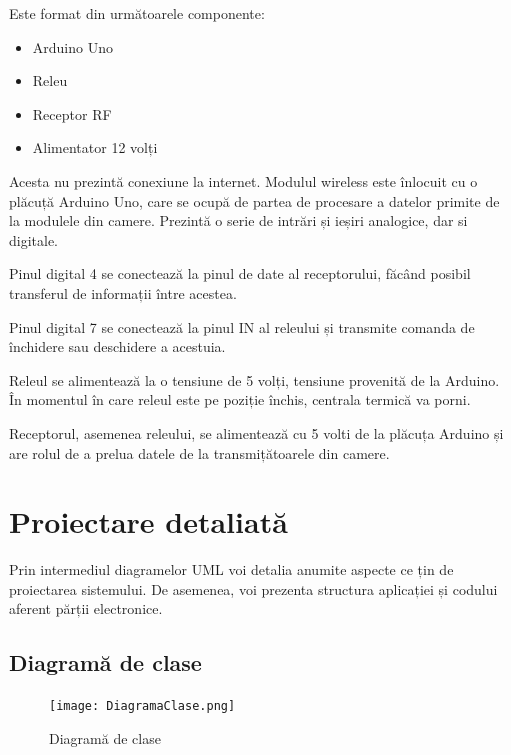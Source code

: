 Este format din următoarele componente:
	\begin{itemize}
		\setlength{\itemindent}{2em}
			\itemsep0em
			\item Arduino Uno
			\item Releu
			\item Receptor RF
			\item Alimentator 12 volți
	\end{itemize}

	Acesta nu prezintă conexiune la internet. Modulul wireless este înlocuit cu o plăcuță Arduino Uno, care se ocupă de partea de procesare a datelor primite de la modulele din camere. Prezintă o serie de intrări și ieșiri analogice, dar si digitale. 

	Pinul digital 4 se conectează la pinul de date al receptorului, făcând posibil transferul de informații între acestea.
	
	Pinul digital 7 se conectează la pinul IN al releului și transmite comanda de închidere sau deschidere a acestuia.

\vspace{1em}

	Releul se alimentează la o tensiune de 5 volți, tensiune provenită de la Arduino. În momentul în care releul este pe poziție închis, centrala termică va porni.

\vspace{1em}

	Receptorul, asemenea releului, se alimentează cu 5 volti de la plăcuța Arduino și are rolul de a prelua datele de la transmițătoarele din camere.

\section{Proiectare detaliată}

	Prin intermediul diagramelor UML voi detalia anumite aspecte ce țin de proiectarea sistemului. De asemenea, voi prezenta structura aplicației și codului aferent părții electronice.

\subsection{Diagramă de clase}

\begin{figure}[H]
   	\centering
    	\texttt{[image: DiagramaClase.png]}
	\caption{Diagramă de clase}
	\label{fig:DiagramaClase}
\end{figure}


